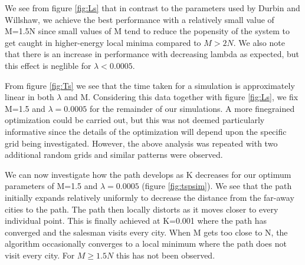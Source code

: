 \documentclass{article}
\begin{document}
We see from figure \ref{fig:Ls} that in contrast to the parameters used by Durbin and Willshaw, we achieve the best performance with a relatively small value of M=1.5N since small values of M tend to reduce the popensity of the system to get caught in higher-energy local minima compared to $M > 2N$. We also note that there is an increase in performance with decreasing lambda as expected, but this effect is neglible for $\lambda < 0.0005$.

From figure \ref{fig:Ts} we see that the time taken for a simulation is approximately linear in both $\lambda$ and M. Considering this data together with figure \ref{fig:Ls}, we fix M=1.5 and $\lambda = 0.0005$ for the remainder of our simulations. A more finegrained optimization could be carried out, but this was not deemed particularly informative since the details of the optimization will depend upon the specific grid being investigated. However, the above analysis was repeated with two additional random grids and similar patterns were observed.

We can now investigate how the path develops as K decreases for our optimum parameters of M=1.5 and $\lambda = 0.0005$ (figure \ref{fig:tspsim}). We see that the path initially expands relatively uniformly to decrease the distance from the far-away cities to the path. The path then locally distorts as it moves closer to every individual point. This is finally achieved at K=0.001 where the path has converged and the salesman visits every city. When M gets too close to N, the algorithm occasionally converges to a local minimum where the path does not visit every city. For $M \geq 1.5N$ this has not been observed.
\end{document}
